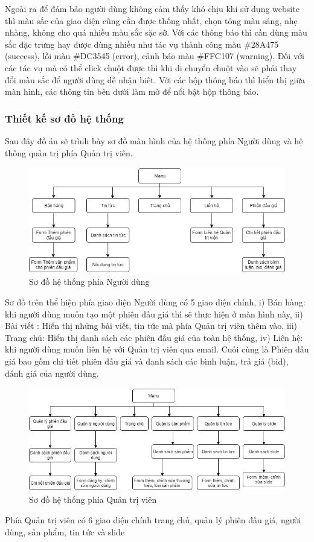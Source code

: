 \documentclass[../DoAn.tex]{subfiles}
\begin{document}
Ngoài ra để đảm bảo người dùng không cảm thấy khó chịu khi sử dụng website thì màu sắc của giao diện cũng cần được thống nhất, chọn tông màu sáng, nhẹ nhàng, không cho quá nhiều màu sắc sặc sỡ. Với các thông báo thì cần dùng màu sắc đặc trưng hay được dùng nhiều như tác vụ thành công màu \#28A475 (success), lỗi màu \#DC3545 (error), cảnh báo màu \#FFC107 (warning). Đối với các tác vụ mà có thể click chuột được thì khi di chuyển chuột vào sẽ phải thay đổi màu sắc để người dùng dễ nhận biết. Với các hộp thông báo thì hiển thị giữa màn hình, các thông tin bên dưới làm mờ để nổi bật hộp thông báo.
\subsubsection{Thiết kế sơ đồ hệ thống}
Sau đây đồ án sẽ trình bày sơ đồ màn hình của hệ thống phía Người dùng và hệ thống quản trị phía Quản trị viên.
\begin{figure}[H]
    \centering
    \includegraphics[width=11.4cm,height=4.65cm]{Hinhve/clientpage.png}
    \caption{Sơ đồ hệ thống phía Người dùng}
    \label{fig:Fig46}
\end{figure}
Sơ đồ trên thể hiện phía giao diện Người dùng có 5 giao diện chính, i) Bán hàng: khi người dùng muốn tạo một phiên đấu giá thì sẽ thực hiện ở màn hình này, ii) Bài viết : Hiển thị những bài viết, tin tức mà phía Quản trị viên thêm vào, iii) Trang chủ:  Hiển thị danh sách các phiên đấu giá của toàn hệ thống, iv) Liên hệ: khi người dùng muốn liên hệ với Quản trị viên qua email. Cuối cùng là Phiên đấu giá bao gồm chi tiết phiên đấu giá và danh sách các bình luận, trả giá (bid), đánh giá của người dùng.
\begin{figure}[H]
    \centering
    \includegraphics[width=11.4cm,height=4.54cm]{Hinhve/adminpage.png}
    \caption{Sơ đồ hệ thống phía Quản trị viên}
    \label{fig:Fig47}
\end{figure}
Phía Quản trị viên có 6 giao diện chính trang chủ, quản lý phiên đấu giá, người dùng, sản phẩm, tin tức và slide
\end{document}
